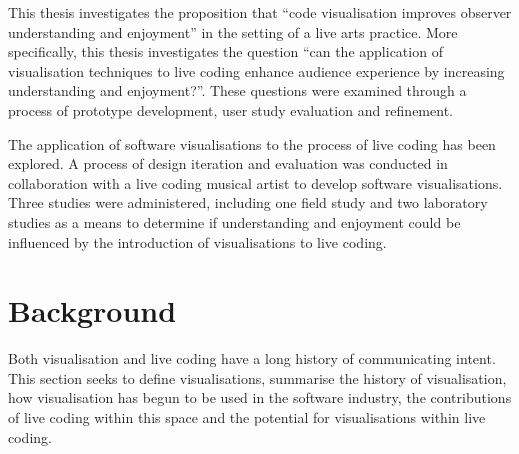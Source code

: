 This thesis investigates the proposition that ``code visualisation improves observer understanding and enjoyment'' in the setting of a live arts practice. More specifically, this thesis investigates the question ``can the application of visualisation techniques to live coding enhance audience experience by increasing understanding and enjoyment?''. These questions were examined through a process of prototype development, user study evaluation and refinement.

The application of software visualisations to the process of live coding has been explored. A process of design iteration and evaluation was conducted in collaboration with a live coding musical artist to develop software visualisations. Three studies were administered, including one field study and two laboratory studies as a means to determine if understanding and enjoyment could be influenced by the introduction of visualisations to live coding.


\section{Background}

Both visualisation and live coding have a long history of communicating intent. This section seeks to define visualisations, summarise the history of visualisation, how visualisation has begun to be used in the software industry, the contributions of live coding within this space and the potential for visualisations within live coding.






